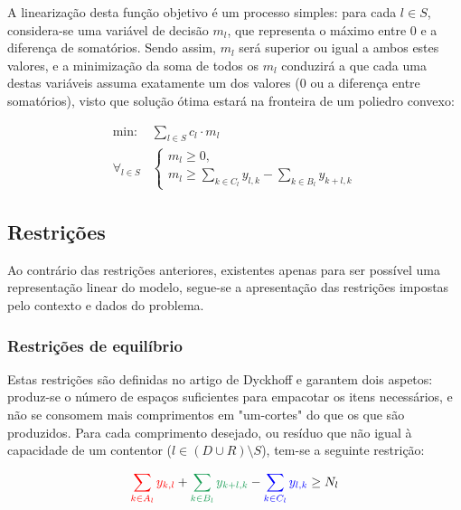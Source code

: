 \documentclass[12pt, a4paper, titlepage]{article}
\begin{document}
A linearização desta função objetivo é um processo simples: para cada $l \in S$, considera-se uma
variável de decisão $m_l$, que representa o máximo entre $0$ e a diferença de somatórios. Sendo
assim, $m_l$ será superior ou igual a ambos estes valores, e a minimização da soma de todos os $m_l$
conduzirá a que cada uma destas variáveis assuma exatamente um dos valores ($0$ ou a diferença entre
somatórios), visto que solução ótima estará na fronteira de um poliedro convexo:

\begin{equation}
    \begin{split}
        \text{min: }      & \sum_{l \in S} c_l \cdot m_l \\
        \forall_{l \in S} & \begin{cases}
            m_l \geq 0, \\
            m_l \geq \sum_{k \in C_l} y_{l,k} - \sum_{k \in B_l} y_{k + l, k}
        \end{cases}
    \end{split}
    \label{eq:objective-expanded}
\end{equation}

\subsection{Restrições}

Ao contrário das restrições anteriores, existentes apenas para ser possível uma representação linear
do modelo, segue-se a apresentação das restrições impostas pelo contexto e dados do problema.

\subsubsection{Restrições de equilíbrio}

Estas restrições são definidas no artigo de Dyckhoff \cite{dyckhoff} e garantem dois aspetos:
produz-se o número de espaços suficientes para empacotar os itens necessários, e não se consomem
mais comprimentos em "um-cortes"{} do que os que são produzidos. Para cada comprimento desejado, ou
resíduo que não igual à capacidade de um contentor ($l \in (D \cup R) \setminus S$), tem-se a
seguinte restrição:

\begin{equation}
    {\color{red} \sum_{k \in A_l} y_{k, l}} +
    {\color{ForestGreen} \sum_{k \in B_l} y_{k + l, k}} -
    {\color{blue} \sum_{k \in C_l} y_{l, k}} \geq N_l
    \label{eq:balance-restriction}
\end{equation}
\end{document}

